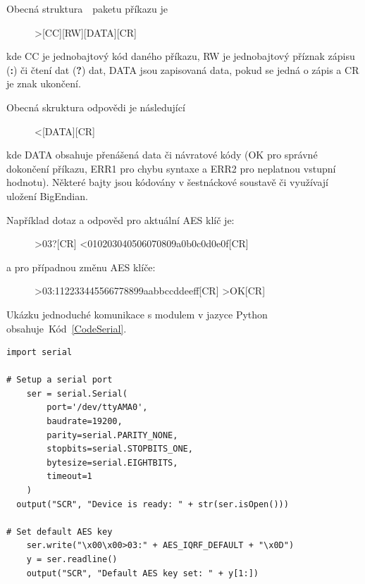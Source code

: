 \newpage
Obecná struktura~\cite{ModulIQRF}~paketu příkazu je 

\begin{figure}[!ht]
\begin{centerverbatim}
			>[CC][RW][DATA][CR]
\end{centerverbatim}
\end{figure}

kde CC je jednobajtový kód daného příkazu, RW je jednobajtový příznak zápisu (\textbf{:}) či čtení dat (\textbf{?}) dat, DATA jsou zapisovaná data, pokud se jedná o zápis a CR je znak ukončení.

Obecná skruktura odpovědi je následující

\begin{figure}[!ht]
\begin{centerverbatim}
	<[DATA][CR]
\end{centerverbatim}
\end{figure}

kde DATA obsahuje přenášená data či návratové kódy (OK pro správné dokončení příkazu, ERR1 pro chybu syntaxe a ERR2 pro neplatnou vstupní hodnotu). Některé bajty jsou kódovány v šestnáckové soustavě či využívají uložení BigEndian.

Například dotaz a odpověd pro aktuální AES klíč je:
\label{KapitolaStazeniKlice}

\begin{figure}[!ht]
\begin{centerverbatim}
	>03?[CR]
	<010203040506070809a0b0c0d0e0f[CR]  
\end{centerverbatim}
\end{figure}

a pro případnou změnu AES klíče:

\begin{figure}[!ht]
\begin{centerverbatim}
>03:112233445566778899aabbccddeeff[CR]
>OK[CR]
\end{centerverbatim}
\end{figure}

Ukázku jednoduché komunikace s modulem v jazyce Python obsahuje~Kód~\ref{CodeSerial}.

\begin{lstlisting}[caption={Komunikace s modulem přes sériový port},captionpos=b,label=CodeSerial,style=MyCodePython]
import serial

# Setup a serial port
	ser = serial.Serial(
		port='/dev/ttyAMA0',
		baudrate=19200,
		parity=serial.PARITY_NONE,
		stopbits=serial.STOPBITS_ONE,
		bytesize=serial.EIGHTBITS,
		timeout=1
	)
  output("SCR", "Device is ready: " + str(ser.isOpen()))

# Set default AES key
	ser.write("\x00\x00>03:" + AES_IQRF_DEFAULT + "\x0D")
	y = ser.readline()
	output("SCR", "Default AES key set: " + y[1:])
\end{lstlisting}




